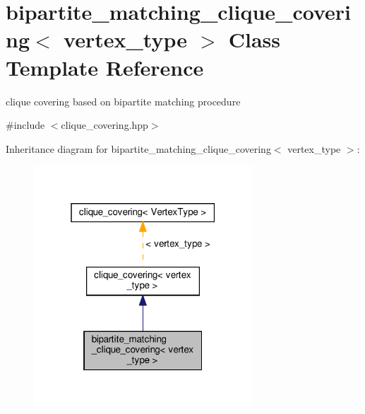 \hypertarget{classbipartite__matching__clique__covering}{}\section{bipartite\+\_\+matching\+\_\+clique\+\_\+covering$<$ vertex\+\_\+type $>$ Class Template Reference}
\label{classbipartite__matching__clique__covering}


clique covering based on bipartite matching procedure  




{\ttfamily \#include $<$clique\+\_\+covering.\+hpp$>$}



Inheritance diagram for bipartite\+\_\+matching\+\_\+clique\+\_\+covering$<$ vertex\+\_\+type $>$\+:
\nopagebreak
\begin{figure}[H]
\begin{center}
\leavevmode
\includegraphics[width=232pt]{d9/d31/classbipartite__matching__clique__covering__inherit__graph}
\end{center}
\end{figure}


